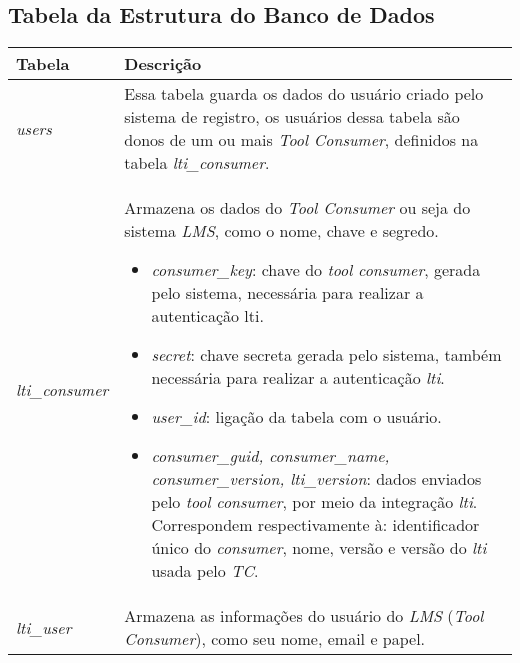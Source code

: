 \begin{anexosenv}

\partanexos

\chapter{Tabela da Estrutura do Banco de Dados}
\label{anx:tabela-estrutura}

    \begin{longtable}{|p{}|p{}|}
        \hline \textbf{Tabela} & \textbf{Descrição} \\
        \hline \textit{users} &
        Essa tabela guarda os dados do usuário criado pelo sistema de registro, os usuários dessa tabela são donos de um ou mais \textit{Tool Consumer}, definidos na tabela \textit{lti\_consumer}.
        \\ 
        \hline \textit{lti\_consumer} &
        Armazena os dados do \textit{Tool Consumer} ou seja do sistema \textit{LMS}, como o nome, chave e segredo.
        
        \begin{itemize}
            \item \textit{consumer\_key}: chave do \textit{tool consumer}, gerada pelo sistema, necessária para realizar a autenticação lti.
            \item \textit{secret}: chave secreta gerada pelo sistema, também necessária para realizar a autenticação \textit{lti}.
            \item \textit{user\_id}: ligação da tabela com o usuário.
            \item \textit{consumer\_guid, consumer\_name, consumer\_version, lti\_version}: dados enviados pelo \textit{tool consumer}, por meio da integração \textit{lti}. Correspondem respectivamente à: identificador único do \textit{consumer}, nome, versão e versão do \textit{lti} usada pelo \textit{TC}.
        \end{itemize}
        \\ 
        \hline \textit{lti\_user} &
        Armazena as informações do usuário do \textit{LMS} (\textit{Tool Consumer}), como seu nome, email e papel.
        

\end{longtable}
\end{anexosenv}
